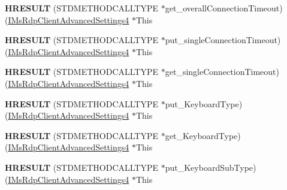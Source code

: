 \begin{DoxyCompactItemize}
{\bfseries H\+R\+E\+S\+U\+LT} (S\+T\+D\+M\+E\+T\+H\+O\+D\+C\+A\+L\+L\+T\+Y\+PE $\ast$get\+\_\+overall\+Connection\+Timeout)(\hyperlink{interface_m_s_t_s_c_lib_1_1_i_ms_rdp_client_advanced_settings4}{I\+Ms\+Rdp\+Client\+Advanced\+Settings4} $\ast$This
\item 
\mbox{\label{struct_m_s_t_s_c_lib_1_1_i_ms_rdp_client_advanced_settings4_vtbl_a8203fc2fabe09e30a042581671ab489b}} 
{\bfseries H\+R\+E\+S\+U\+LT} (S\+T\+D\+M\+E\+T\+H\+O\+D\+C\+A\+L\+L\+T\+Y\+PE $\ast$put\+\_\+single\+Connection\+Timeout)(\hyperlink{interface_m_s_t_s_c_lib_1_1_i_ms_rdp_client_advanced_settings4}{I\+Ms\+Rdp\+Client\+Advanced\+Settings4} $\ast$This
\item 
\mbox{\label{struct_m_s_t_s_c_lib_1_1_i_ms_rdp_client_advanced_settings4_vtbl_a9e07eb8ce184b425b9f13975c21531a4}} 
{\bfseries H\+R\+E\+S\+U\+LT} (S\+T\+D\+M\+E\+T\+H\+O\+D\+C\+A\+L\+L\+T\+Y\+PE $\ast$get\+\_\+single\+Connection\+Timeout)(\hyperlink{interface_m_s_t_s_c_lib_1_1_i_ms_rdp_client_advanced_settings4}{I\+Ms\+Rdp\+Client\+Advanced\+Settings4} $\ast$This
\item 
\mbox{\label{struct_m_s_t_s_c_lib_1_1_i_ms_rdp_client_advanced_settings4_vtbl_aca86a5d6010834ea53dc654c7fb27ef4}} 
{\bfseries H\+R\+E\+S\+U\+LT} (S\+T\+D\+M\+E\+T\+H\+O\+D\+C\+A\+L\+L\+T\+Y\+PE $\ast$put\+\_\+\+Keyboard\+Type)(\hyperlink{interface_m_s_t_s_c_lib_1_1_i_ms_rdp_client_advanced_settings4}{I\+Ms\+Rdp\+Client\+Advanced\+Settings4} $\ast$This
\item 
\mbox{\label{struct_m_s_t_s_c_lib_1_1_i_ms_rdp_client_advanced_settings4_vtbl_acc9bd88ee2ad7768db0dc3ccbd633ce1}} 
{\bfseries H\+R\+E\+S\+U\+LT} (S\+T\+D\+M\+E\+T\+H\+O\+D\+C\+A\+L\+L\+T\+Y\+PE $\ast$get\+\_\+\+Keyboard\+Type)(\hyperlink{interface_m_s_t_s_c_lib_1_1_i_ms_rdp_client_advanced_settings4}{I\+Ms\+Rdp\+Client\+Advanced\+Settings4} $\ast$This
\item 
\mbox{\label{struct_m_s_t_s_c_lib_1_1_i_ms_rdp_client_advanced_settings4_vtbl_a87bf4d2aad7ce8d8384245f95a26adaa}} 
{\bfseries H\+R\+E\+S\+U\+LT} (S\+T\+D\+M\+E\+T\+H\+O\+D\+C\+A\+L\+L\+T\+Y\+PE $\ast$put\+\_\+\+Keyboard\+Sub\+Type)(\hyperlink{interface_m_s_t_s_c_lib_1_1_i_ms_rdp_client_advanced_settings4}{I\+Ms\+Rdp\+Client\+Advanced\+Settings4} $\ast$This

\end{DoxyCompactItemize}
